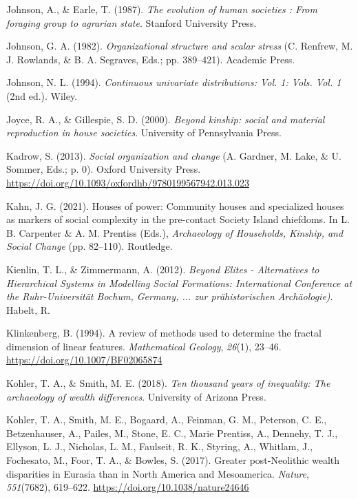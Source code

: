 \documentclass[
  12pt,
]{book}
\newlength{\cslhangindent}
\newlength{\cslentryspacingunit} %
\newenvironment{CSLReferences}[2] %
 {%
  \setlength{\parindent}{0pt}
  \ifodd #1
  \let\oldpar\par
  \def\par{\hangindent=\cslhangindent\oldpar}
  \fi
  \setlength{\parskip}{#2\cslentryspacingunit}
 }%
 {}
\begin{document}
\begin{CSLReferences}{1}{0}
\leavevmode{}%
Johnson, A., \& Earle, T. (1987). \emph{The evolution of human societies : From foraging group to agrarian state}. Stanford University Press.

\leavevmode{}%
Johnson, G. A. (1982). \emph{Organizational structure and scalar stress} (C. Renfrew, M. J. Rowlands, \& B. A. Segraves, Eds.; pp. 389--421). Academic Press.

\leavevmode{}%
Johnson, N. L. (1994). \emph{Continuous univariate distributions: Vol. 1: Vols. Vol. 1} (2nd ed.). Wiley.

\leavevmode{}%
Joyce, R. A., \& Gillespie, S. D. (2000). \emph{Beyond kinship: social and material reproduction in house societies}. University of Pennsylvania Press.

\leavevmode{}%
Kadrow, S. (2013). \emph{Social organization and change} (A. Gardner, M. Lake, \& U. Sommer, Eds.; p. 0). Oxford University Press. \url{https://doi.org/10.1093/oxfordhb/9780199567942.013.023}

\leavevmode{}%
Kahn, J. G. (2021). Houses of power: {Community} houses and specialized houses as markers of social complexity in the pre-contact {Society Island} chiefdoms. In L. B. Carpenter \& A. M. Prentiss (Eds.), \emph{Archaeology of {Households}, {Kinship}, and {Social Change}} (pp. 82--110). {Routledge}.

\leavevmode{}%
Kienlin, T. L., \& Zimmermann, A. (2012). \emph{Beyond Elites - Alternatives to Hierarchical Systems in Modelling Social Formations: International Conference at the Ruhr-Universität Bochum, Germany, ... zur prähistorischen Archäologie)}. Habelt, R.

\leavevmode{}%
Klinkenberg, B. (1994). A review of methods used to determine the fractal dimension of linear features. \emph{Mathematical Geology}, \emph{26}(1), 23--46. \url{https://doi.org/10.1007/BF02065874}

\leavevmode{}%
Kohler, T. A., \& Smith, M. E. (2018). \emph{Ten thousand years of inequality: The archaeology of wealth differences}. University of Arizona Press.

\leavevmode{}%
Kohler, T. A., Smith, M. E., Bogaard, A., Feinman, G. M., Peterson, C. E., Betzenhauser, A., Pailes, M., Stone, E. C., Marie Prentiss, A., Dennehy, T. J., Ellyson, L. J., Nicholas, L. M., Faulseit, R. K., Styring, A., Whitlam, J., Fochesato, M., Foor, T. A., \& Bowles, S. (2017). Greater post-Neolithic wealth disparities in Eurasia than in North America and Mesoamerica. \emph{Nature}, \emph{551}(7682), 619--622. \url{https://doi.org/10.1038/nature24646}


\end{CSLReferences}
\end{document}
